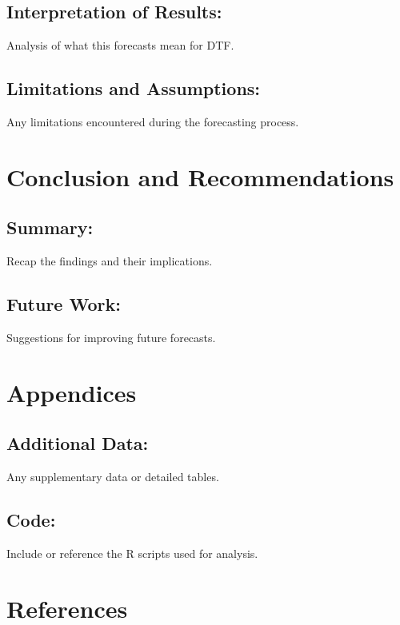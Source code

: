 \documentclass[11pt,a4paper,]{article}
\begin{document}
\subsection{Interpretation of Results:}\label{interpretation-of-results}

Analysis of what this forecasts mean for DTF.

\subsection{Limitations and Assumptions:}\label{limitations-and-assumptions}

Any limitations encountered during the forecasting process.

\section{Conclusion and Recommendations}\label{conclusion-and-recommendations}

\subsection{Summary:}\label{summary}

Recap the findings and their implications.

\subsection{Future Work:}\label{future-work}

Suggestions for improving future forecasts.

\section{Appendices}\label{appendices}

\subsection{Additional Data:}\label{additional-data}

Any supplementary data or detailed tables.

\subsection{Code:}\label{code}

Include or reference the R scripts used for analysis.

\section{References}\label{references}
\end{document}
